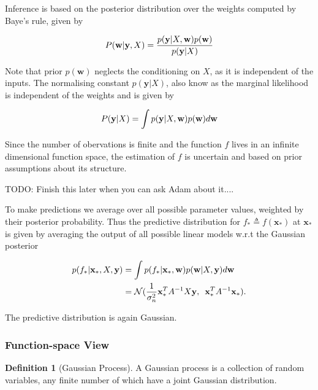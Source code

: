 \documentclass[12pt,a4paper]{report}
\theoremstyle{definition}
\newtheorem{definition}{Definition}[section]
\begin{document}
Inference is based on the posterior distribution over the weights computed by Baye's rule, given by

\begin{equation}
	\centering
	P(\textbf{w} | \textbf{y}, X)  = \frac{p(\textbf{y} | X, \textbf{w})p(\textbf{w})}{p(\textbf{y} | X)}
\end{equation}

Note that prior $p(\textbf{w})$ neglects the conditioning on $X$, as it is independent of the inputs. The normalising constant $p(\textbf{y} | X)$, also know as the marginal likelihood is independent of the weights and is given by

\begin{equation}
	\centering
	P(\textbf{y} | X)  = \int p(\textbf{y} | X, \textbf{w})p(\textbf{w}) d\textbf{w}
\end{equation}

Since the number of obervations is finite and the function $f$ lives in an infinite dimensional function space, the estimation of $f$ is uncertain and based on prior assumptions about its structure.

TODO: Finish this later when you can ask Adam about it....

To make predictions we average over all possible parameter values, weighted by their posterior probability.
Thus the predictive distribution for $f_{*} \triangleq f(\textbf{x}_{*})$ at $\textbf{x}_{*}$ is given by averaging the output of all possible linear models w.r.t the Gaussian posterior

\begin{equation}
	\begin{aligned}
		\centering 
		p(f_{*} | \textbf{x}_{*}, X, \textbf{y}) &= \int p(f_{*} | \textbf{x}_{*}, \textbf{w})p(\textbf{w} | X, \textbf{y}) d\textbf{w}\\
		&= \mathcal{N}(\frac{1}{\sigma_{n}^2} \textbf{x}_{*}^T A^{-1} X \textbf{y}, \enskip \textbf{x}_{*}^T A^{-1} \textbf{x}_{*}).
	\end{aligned}
\end{equation}

The predictive distribution is again Gaussian.

\subsubsection{Function-space View}

\begin{definition}[Gaussian Process]
A Gaussian process is a collection of random variables, any finite number of which have a joint Gaussian distribution. 
\end{definition}
\end{document}
